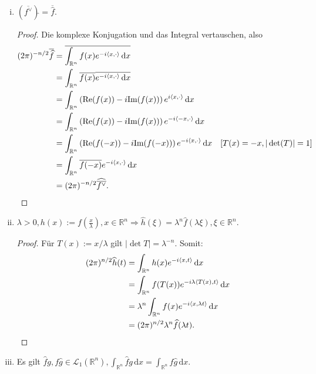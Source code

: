 \documentclass[10pt]{article}\usepackage[]{graphicx}\usepackage[]{color}
\newcommand{\R}{\mathbb{R}}
\newcommand{\df}{\,\textrm{d}}
\begin{document}
\begin{enumerate}[(a)]
\begin{enumerate}[(i)]
  \item $\left( \overline{f^{\lor}}\right)\widehat{} = \overline{\widehat{f}}$.
  \begin{proof}
    Die komplexe Konjugation und das Integral vertauschen, also
    \begin{align*}
      (2\pi)^{-n/2} \overline{\widehat{f}}
      &= \overline{\int_{\R^n}f(x)e^{-i\langle x, \cdot \rangle} \df x} &\\
      &= \int_{\R^n}\overline{f(x)}\overline{e^{-i\langle x, \cdot \rangle} \df x} &\\
      &= \int_{\R^n}\left(\textrm{Re}(f(x)) - i\textrm{Im}(f(x))\right)e^{i\langle x, \cdot \rangle} \df x &\\
      &= \int_{\R^n}\left(\textrm{Re}(f(x)) - i\textrm{Im}(f(x))\right)e^{-i\langle -x, \cdot \rangle} \df x &\\
      &= \int_{\R^n}\left(\textrm{Re}(f(-x)) - i\textrm{Im}(f(-x))\right)e^{-i\langle x, \cdot \rangle} \df x & [T(x) = -x, |\det(T)| = 1] \\
      &= \int_{\R^n} \overline{f(-x)}e^{-i\langle x, \cdot \rangle} \df x \\
      &= (2\pi)^{-n/2}\widehat{\overline{f^{\lor}}}.& \qedhere
    \end{align*}
  \end{proof}
  
  \item $\lambda > 0, h(x) := f(\frac{x}{\lambda}), x \in \R^n \Rightarrow \widehat{h}(\xi) = \lambda^n \widehat{f}(\lambda \xi), \xi \in \R^n$.
  \begin{proof}
  Für $T(x) := x/\lambda$ gilt $|\det T| = \lambda^{-n}$.
  Somit:
\begin{align*}
  (2\pi)^{n/2} \widehat{h}(t)
  &= \int_{\R^n} h(x) e^{-i \langle x, t\rangle} \df x \\
  &= \int_{\R^n} f(T(x)) e^{-i \lambda \langle T(x), t \rangle} \df x \\
  &= \lambda^n \int_{\R^n} f(x) e^{-i \langle x, \lambda t \rangle} \df x \\
  &=  (2\pi)^{n/2} \lambda^n \widehat{f}(\lambda t).\qedhere
\end{align*}

  \end{proof}
  
  
  \item Es gilt $\widehat{f}g, f\widehat{g} \in \mathscr{L}_1(\R^n), \int_{\R^n}\widehat{f}g \df x = \int_{\R^n}f \widehat{g} \df x$.
  

\end{enumerate}
\end{enumerate}
\end{document}
